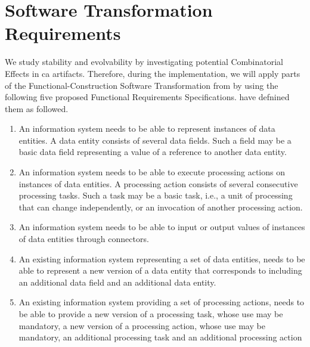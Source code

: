 \section{Software Transformation Requirements} \label{sec_requirements_transformation}

We study stability and evolvability by investigating potential Combinatorial Effects in
\gls{ca} artifacts. Therefore, during the implementation, we will apply parts of the
Functional-Construction Software Transformation from
\textcite[251]{mannaert_normalized_2016} by using the following five proposed Functional
Requirements Specifications. \textcite[254-261]{mannaert_normalized_2016} have defnined
them as followed.

\begin{enumerate}[leftmargin=*]
    \item An information system needs to be able to represent instances of
    data entities. A data entity consists of several data fields. Such a field may be a basic
    data field representing a value of a reference to another data entity.
    
    \item An information system needs to be able to execute processing actions on
    instances of data entities. A processing action consists of several consecutive processing
    tasks. Such a task may be a basic task, i.e., a unit of processing that can change
    independently, or an invocation of another processing action.
    
    \item An information system needs to be able to input or output values
    of instances of data entities through connectors.
    
    \item An existing information system representing a set of data entities, needs
    to be able to represent a new version of a data entity that corresponds to including an additional
    data field and an additional data entity.
    
    \item An existing information system providing a set of processing
    actions, needs to be able to provide a new version of a processing task, whose use may
    be mandatory, a new version of a processing action, whose use may be mandatory, an
    additional processing task and an additional processing action
    
\end{enumerate}